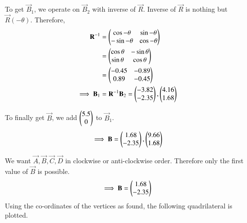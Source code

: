 \documentclass[journal,12pt,twocolumn]{IEEEtran}
\begin{document}
To get $\vec{B}_1$, we operate on $\vec{B}_2$ with inverse of $\vec{R}$. Inverse of $\vec{R}$ is nothing but $\vec{R}(-\theta)$. Therefore,
\begin{align}
    \mathbf{R}^{-1} &= \begin{pmatrix}\cos{-\theta}& \sin{-\theta}\\ -\sin{-\theta} & \cos{-\theta}\end{pmatrix}\\
                 &= \begin{pmatrix}\cos{\theta}& -\sin{\theta}\\ \sin{\theta} & \cos{\theta}\end{pmatrix}\\
                 &= \begin{pmatrix}-0.45 & -0.89\\0.89 & -0.45\end{pmatrix}\\
    \implies \mathbf{B}_1 &= \mathbf{R}^{-1}\mathbf{B}_2 = \begin{pmatrix}-3.82\\-2.35\end{pmatrix}, \begin{pmatrix}4.16\\1.68\end{pmatrix}
\end{align}

To finally get $\vec{B}$, we add $\begin{pmatrix}5.5\\0\end{pmatrix}$ to $\vec{B}_1$.
\begin{equation}
    \implies \mathbf{B} = \begin{pmatrix}1.68\\-2.35\end{pmatrix}, \begin{pmatrix}9.66\\1.68\end{pmatrix}
\end{equation}

We want $\vec{A},\vec{B},\vec{C},\vec{D}$ in clockwise or anti-clockwise order. Therefore only the first value of $\vec{B}$ is possible. 
\begin{equation}
    \implies \mathbf{B} = \begin{pmatrix}1.68\\-2.35\end{pmatrix}
\end{equation}
Using the co-ordinates of the vertices as found, the following quadrilateral is plotted.
\begin{figure}[h]
\end{figure}
\end{document}
